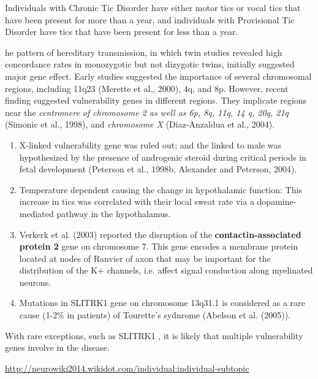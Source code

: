 \begin{mdframed}

Individuals with Chronic Tic Disorder have either motor tics or
vocal tics that have been present for more than a year, and individuals with
Provisional Tic Disorder have tics that have been present for less than a year.

\end{mdframed}

he pattern of hereditary transmission, in which twin studies revealed high
concordance rates in   monozygotic   but   not   dizygotic   twins,   initially
suggested  major  gene  effect.
Early studies suggested the  importance of   several   chromosomal   regions,
including   11q23 (Merette et al., 2000), 4q, and 8p. However, recent finding
suggested vulnerability genes in different regions. They implicate regions near
the {\it centromere of chromosome 2 as well as 6p, 8q, 11q, 14 q, 20q, 21q}
(Simonic et al., 1998),  and {\it chromosome X}  (Diaz-Anzaldua  et  al., 2004).
\begin{enumerate}
  \item 
  X-linked vulnerability gene was ruled out; and the linked to male
  was hypothesized by the presence of androgenic steroid during critical periods
  in fetal development  (Peterson
et al., 1998b, Alexander  and
Peterson, 2004).

  \item Temperature dependent causing the change in hypothalamic function: This
  increase in tics was   correlated   with   their   local   sweat   rate   via 
   a dopamine-mediated pathway in the hypothalamus.
  
  \item  Verkerk et al. (2003) reported the
  disruption of the {\bf contactin-associated protein 2} gene on chromosome 7. This gene
encodes a membrane protein located  at  nodes  of  Ranvier  of  axon that may be important
for the distribution of the K+ channels, i.e. affect signal conduction along
myelinated neurons.

  \item  Mutations in SLITRK1 gene on chromosome 13q31.1 is considered as a
  rare cause (1-2\% in patients) of Tourette's sydnrome (Abelson et al. (2005)).
\end{enumerate}

With rare exceptions, such as SLITRK1 , it is likely that  multiple 
vulnerability  genes  involve in the disease.


\url{http://neurowiki2014.wikidot.com/individual:individual-subtopic}


